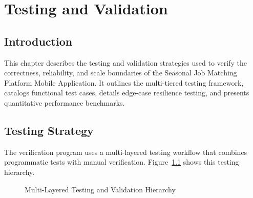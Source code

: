 \chapter{Testing and Validation}
\label{ch:testing_and_validation}

\section{Introduction}
This chapter describes the testing and validation strategies used to verify the correctness, reliability, and scale boundaries of the Seasonal Job Matching Platform Mobile Application. It outlines the multi-tiered testing framework, catalogs functional test cases, details edge-case resilience testing, and presents quantitative performance benchmarks.

\section{Testing Strategy}
The verification program uses a multi-layered testing workflow that combines programmatic tests with manual verification. Figure~\ref{fig:testing_workflow} shows this testing hierarchy.

\begin{figure}[htbp]
\centering
{}
\caption{Multi-Layered Testing and Validation Hierarchy}
\label{fig:testing_workflow}
\end{figure}

